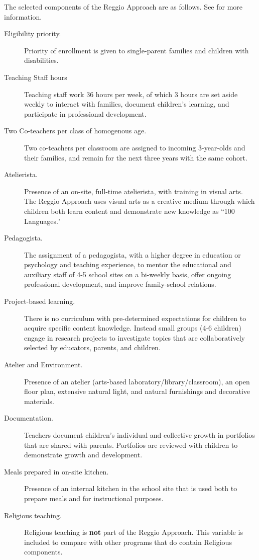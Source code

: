 The selected components of the Reggio Approach are as follows. See \citet{Rinaldi_2006_ReggioEmilia_BOOK,Giudici-Nicolosi_2014_Reggio-Approach, Cagliari-etal-eds_2016_BOOK_Loris-Malaguzzi} for more information.
\begin{description}
\item[Eligibility priority.] Priority of enrollment is given to single-parent families and children with disabilities.
\item[Teaching Staff hours] Teaching staff work 36 hours per week, of which 3 hours are set aside weekly to interact with families, document children's learning, and participate in professional development.
\item[Two Co-teachers per class of homogenous age.] Two co-teachers per classroom are assigned to incoming 3-year-olds and their families, and remain for the next three years with the same cohort.
\item[Atelierista.] Presence of an on-site, full-time atelierista, with training in visual arts. The Reggio Approach uses visual arts as a creative medium through which children both learn content and demonstrate new knowledge as ``100 Languages."
\item[Pedagogista.] The assignment of a pedagogista, with a higher degree in education or psychology and teaching experience, to mentor the educational and auxiliary staff of 4-5 school sites on a bi-weekly basis, offer ongoing professional development, and improve family-school relations.
\item[Project-based learning.] There is no curriculum with pre-determined expectations for children to acquire specific content knowledge. Instead small groups (4-6 children) engage in research projects to investigate topics that are collaboratively selected by educators, parents, and children. 
\item[Atelier and Environment.] Presence of an atelier (arts-based laboratory/library/classroom), an open floor plan, extensive natural light, and natural furnishings and decorative materials.
\item[Documentation.] Teachers document children's individual and collective growth in portfolios that are shared with parents. Portfolios are reviewed with children to demonstrate growth and development.
\item[Meals prepared in on-site kitchen.] Presence of an internal kitchen in the school site that is used both to prepare meals and for instructional purposes.
\item[Religious teaching.] Religious teaching is \textbf{not} part of the Reggio Approach. This variable is included to compare with other programs that do contain Religious components.
\end{description}

